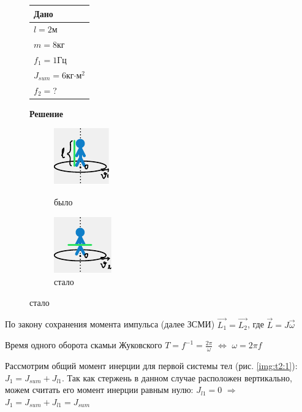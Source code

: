 \documentclass[a4paper,12pt]{article}
\begin{document}
    \begin{figure}[H]
            \begin{tabular}{p{} |}
                \textbf{Дано} \\
                \hline
                $l = 2$м \\
                $m = 8$кг \\
                $f_1 = 1$Гц \\
                $J_{sum} = 6$кг$\cdot$м$^2$ \\
                \hline
                $f_2 = $?
            \end{tabular}
        \endminipage
            \textbf{Решение}

            \begin{figure}[H]
                \centering
                    \centering
                    \includegraphics[scale=1.5]{01_03}
                    \caption{было}
                    \label{img:t2:1}
                \endminipage
                    \centering
                    \includegraphics[scale=1.5]{01_04}
                    \caption{стало}
                    \label{img:t2:2}
                \endminipage
            \end{figure}
        \endminipage
    \end{figure}

    По закону сохранения момента импульса (далее ЗСМИ) $\vec{L_1} = \vec{L_2}$, где
    $\vec{L} = J\vec{\omega}$

    Время одного оборота скамьи Жуковского $T = f^{-1} = \frac{2\pi}{\omega}$
    $\Leftrightarrow$ $\omega = 2\pi f$

    Рассмотрим общий момент инерции для первой системы тел (рис. \ref{img:t2:1}):
    $J_1 = J_{sum} + J_{l1}$. Так как стержень в данном случае расположен вертикально,
    можем считать его момент инерции равным нулю: $J_{l1} = 0$ $\Rightarrow$ $J_1 = J_{sum} + J_{l1} = J_{sum}$
\end{document}
